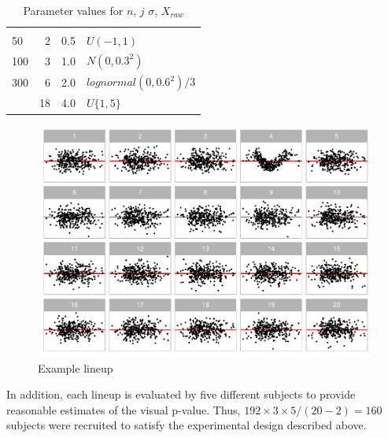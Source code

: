 \documentclass[]{interact}
\theoremstyle{plain}%
\theoremstyle{definition}
\theoremstyle{remark}
\begin{document}
\begin{table}

\caption{\label{tab:parameter-table}Parameter values for $n$, $j$ $\sigma$, $X_{raw}$}
\centering
\begin{tabular}[t]{lrrl}
\toprule
{} &  &  &  \\
\cmidrule(l{3pt}r{3pt}){1-1} \cmidrule(l{3pt}r{3pt}){2-2} \cmidrule(l{3pt}r{3pt}){3-3} \cmidrule(l{3pt}r{3pt}){4-4}
50 & 2 & 0.5 & $U(-1, 1)$\\
100 & 3 & 1.0 & $N(0, 0.3^2)$\\
300 & 6 & 2.0 & $lognormal(0, 0.6^2)/3$\\
 & 18 & 4.0 & $U\{1, 5\}$\\
\bottomrule
\end{tabular}
\end{table}

\begin{figure}
\centering
\includegraphics{paper_comparison_files/figure-latex/example-lineup-1.pdf}
\caption{Example lineup \label{fig:example-lineup}}
\end{figure}

In addition, each lineup is evaluated by five different subjects to
provide reasonable estimates of the visual p-value. Thus,
\(192 \times 3 \times 5 / (20 - 2) = 160\) subjects were recruited to
satisfy the experimental design described above.
\end{document}
